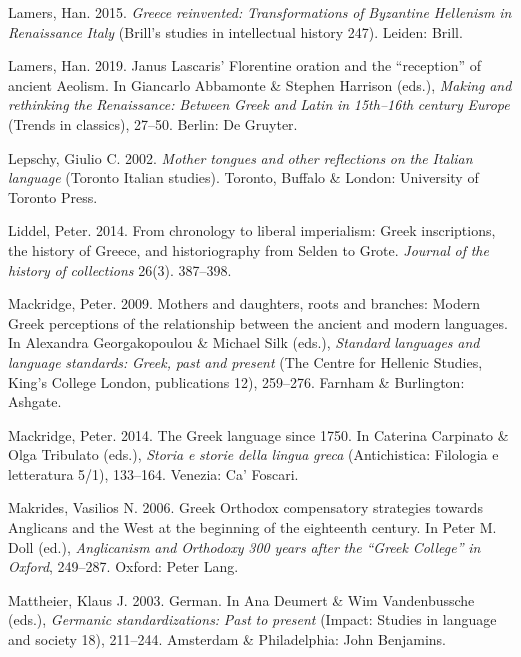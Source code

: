 \documentclass[output=paper]{langsci/langscibook}
\begin{document}
Lamers, Han. 2015. \textit{Greece} \textit{reinvented:} \textit{Transformations} \textit{of} \textit{Byzantine} \textit{Hellenism} \textit{in} \textit{Renaissance} \textit{Italy} (Brill’s studies in intellectual history 247). Leiden: Brill.

Lamers, Han. 2019. Janus Lascaris’ Florentine oration and the “reception” of ancient Aeolism. In Giancarlo Abbamonte \& Stephen Harrison (eds.), \textit{Making} \textit{and} \textit{rethinking} \textit{the} \textit{Renaissance:} \textit{Between} \textit{Greek} \textit{and} \textit{Latin} \textit{in} \textit{15th–16th} \textit{century} \textit{Europe} (Trends in classics), 27–50. Berlin: De Gruyter.

Lepschy, Giulio C. 2002. \textit{Mother} \textit{tongues} \textit{and} \textit{other} \textit{reflections} \textit{on} \textit{the} \textit{Italian} \textit{language} (Toronto Italian studies). Toronto, Buffalo \& London: University of Toronto Press.

Liddel, Peter. 2014. From chronology to liberal imperialism: Greek inscriptions, the history of Greece, and historiography from Selden to Grote. \textit{Journal} \textit{of} \textit{the} \textit{history} \textit{of} \textit{collections} 26(3). 387–398.

Mackridge, Peter. 2009. Mothers and daughters, roots and branches: Modern Greek perceptions of the relationship between the ancient and modern languages. In Alexandra Georgakopoulou \& Michael Silk (eds.), \textit{Standard} \textit{languages} \textit{and} \textit{language} \textit{standards:} \textit{Greek,} \textit{past} \textit{and} \textit{present} (The Centre for Hellenic Studies, King’s College London, publications 12), 259–276. Farnham \& Burlington: Ashgate.

Mackridge, Peter. 2014. The Greek language since 1750. In Caterina Carpinato \& Olga Tribulato (eds.), \textit{Storia} \textit{e} \textit{storie} \textit{della} \textit{lingua} \textit{greca} (Antichistica: Filologia e letteratura 5/1), 133–164. Venezia: Ca’ Foscari.

Makrides, Vasilios N. 2006. Greek Orthodox compensatory strategies towards Anglicans and the West at the beginning of the eighteenth century. In Peter M. Doll (ed.), \textit{Anglicanism} \textit{and} \textit{Orthodoxy} \textit{300} \textit{years} \textit{after} \textit{the} \textit{“Greek} \textit{College”} \textit{in} \textit{Oxford}, 249–287. Oxford: Peter Lang.

Mattheier, Klaus J. 2003. German. In Ana Deumert \& Wim Vandenbussche (eds.), \textit{Germanic} \textit{standardizations:} \textit{Past} \textit{to} \textit{present} (Impact: Studies in language and society 18), 211–244. Amsterdam \& Philadelphia: John Benjamins.
\end{document}
